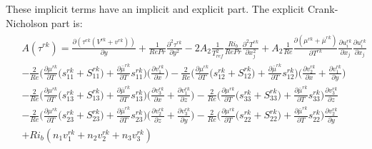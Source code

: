\documentclass[preprint,12pt]{article}
\begin{document}
These implicit terms have an implicit and explicit part. The explicit Crank- Nicholson part is:
\begin{align}\begin{split}
&A(\tau^{rk})=\frac{\partial(\tau^{rk}(V^{rk}+v^{rk}))}{\partial y}+\frac{1}{RePr}\frac{\partial^2\tau^{rk}}{\partial y^2}-2A_2\frac{1}{T_{ref}^2}\frac{Ri_b}{Re Pr}\frac{\partial^2 T^{rk}}{\partial x_j^2}+A_2\frac{1}{Re}\frac{\partial (\mu^{rk}+\overline{\mu}^{rk})}{\partial T^{rk}}\frac{\partial u_{i}^{rk}}{\partial x_j}\frac{\partial u_{i}^{rk}}{\partial x_j}\\&-\frac{2}{Re}\Big(\frac{\partial\mu^{rk}}{\partial T}\big(s_{11}^{rk}+S_{11}^{rk}\big)+\frac{\partial\bar{\mu}^{rk}}{\partial T}s_{11}^{rk}\Big)\Bigg(\frac{\partial v_1^{rk}}{\partial x}\Bigg)-\frac{2}{Re}\Big(\frac{\partial\mu^{rk}}{\partial T}\big(s_{12}^{rk}+S_{12}^{rk}\big)+\frac{\partial\bar{\mu}^{rk}}{\partial T}s_{12}^{rk}\Big)\Bigg(\frac{\partial v_2^{rk}}{\partial x}+\frac{\partial v_1^{rk}}{\partial y}\Bigg)\\&-\frac{2}{Re}\Big(\frac{\partial\mu^{rk}}{\partial T}\big(s_{13}^{rk}+S_{13}^{rk}\big)+\frac{\partial\bar{\mu}^{rk}}{\partial T}s_{13}^{rk}\Big)\Bigg(\frac{\partial v_3^{rk}}{\partial x}+\frac{\partial v_1^{rk}}{\partial z}\Bigg)-\frac{2}{Re}\Big(\frac{\partial\mu^{rk}}{\partial T}\big(s_{33}^{rk}+S_{33}^{rk}\big)+\frac{\partial\bar{\mu}^{rk}}{\partial T}s_{33}^{rk}\Big)\frac{\partial v_3^{rk}}{\partial z}\\&-\frac{2}{Re}\Big(\frac{\partial\mu^{rk}}{\partial T}\big(s_{23}^{rk}+S_{23}^{rk}\big)+\frac{\partial\bar{\mu}^{rk}}{\partial T}s_{23}^{rk}\Big)\Bigg(\frac{\partial v_2^{rk}}{\partial z}+\frac{\partial v_3^{rk}}{\partial y}\Bigg)-\frac{2}{Re}\Big(\frac{\partial\mu^{rk}}{\partial T}\big(s_{22}^{rk}+S_{22}^{rk}\big)+\frac{\partial\bar{\mu}^{rk}}{\partial T}s_{22}^{rk}\Big)\frac{\partial v_2^{rk}}{\partial y}\\&+Ri_b(n_1v_1^{rk}+n_2v_2^{rk}+n_3v_3^{rk})\\&

\end{split}
\end{align}
\end{document}
